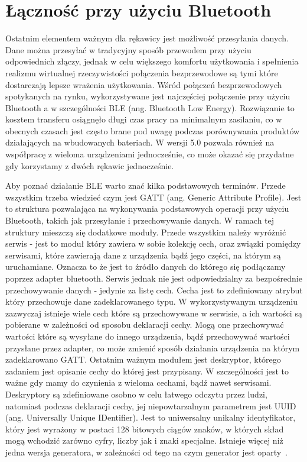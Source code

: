 \section{Łączność przy użyciu Bluetooth}
\label{sec:bvsble}
Ostatnim elementem ważnym dla rękawicy jest możliwość przesyłania danych. Dane można przesyłać w tradycyjny sposób przewodem przy użyciu odpowiednich złączy, jednak w celu większego komfortu użytkowania i spełnienia realizmu wirtualnej rzeczywistości połączenia bezprzewodowe są tymi które dostarczają lepsze wrażenia użytkowania. Wśród połączeń bezprzewodowych spotykanych na rynku, wykorzystywane jest najczęściej połączenie przy użyciu Bluetooth a w szczególności BLE (ang. Bluetooth Low Energy). Rozwiązanie to kosztem transferu osiągnęło długi czas pracy na minimalnym zasilaniu, co w obecnych czasach jest często brane pod uwagę podczas porównywania produktów działających na wbudowanych bateriach. W wersji 5.0 pozwala również na współpracę z wieloma urządzeniami jednocześnie, co może okazać się przydatne gdy korzystamy z dwóch rękawic jednocześnie. 

Aby poznać działanie BLE warto znać kilka podstawowych terminów. Przede wszystkim trzeba wiedzieć czym jest GATT (ang. Generic Attribute Profile). Jest to struktura pozwalająca na wykonywania podstawowych operacji przy użyciu Bluetooth, takich jak przesyłanie i przechowywanie danych.  W ramach tej struktury mieszczą się dodatkowe moduły. Przede wszystkim należy wyróżnić serwis - jest to moduł który zawiera w sobie kolekcję cech, oraz związki pomiędzy serwisami, które zawierają dane z urządzenia bądź jego części, na którym są uruchamiane. Oznacza to że jest to źródło danych do którego się podłączamy poprzez adapter bluetooth. Serwis jednak nie jest odpowiedzialny za bezpośrednie przechowywanie danych - jedynie za listę cech. Cecha jest to zdefiniowany atrybut który przechowuje dane zadeklarowanego typu. W wykorzystywanym urządzeniu zazwyczaj istnieje wiele cech które są przechowywane w serwisie, a ich wartości są pobierane w zależności od sposobu deklaracji cechy. Mogą one przechowywać wartości które są wysyłane do innego urządzenia, bądź przechowywać wartości przysłane przez adapter, co może zmienić sposób działania urządzenia na którym zadeklarowano GATT. Ostatnim ważnym modułem jest deskryptor, którego zadaniem jest opisanie cechy do której jest przypisany. W szczególności jest to ważne gdy mamy do czynienia z wieloma cechami, bądź nawet serwisami. Deskryptory są zdefiniowane osobno w celu łatwego odczytu przez ludzi, natomiast podczas deklaracji cechy, jej niepowtarzalnym parametrem jest UUID (ang. Universally Unique IDentifier). Jest to uniwersalny unikalny identyfikator, który jest wyrażony w postaci 128 bitowych ciągów znaków, w których skład mogą wchodzić zarówno cyfry, liczby jak i znaki specjalne. Istnieje więcej niż jedna wersja generatora, w zależności od tego na czym generator jest oparty~\cite{bleSpec}.
	
